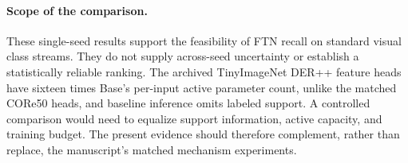 \paragraph{Scope of the comparison.}
These single-seed results support the feasibility of FTN recall on standard visual class streams. They do not supply across-seed uncertainty or establish a statistically reliable ranking. The archived TinyImageNet DER++ feature heads have sixteen times Base's per-input active parameter count, unlike the matched CORe50 heads, and baseline inference omits labeled support. A controlled comparison would need to equalize support information, active capacity, and training budget. The present evidence should therefore complement, rather than replace, the manuscript's matched mechanism experiments.
